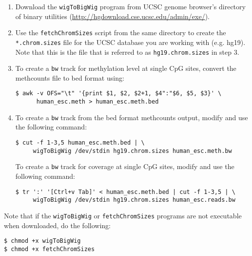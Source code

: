 \documentclass[10pt]{article}
\newcommand{\prog}[1]{\texttt{#1}}
\newcommand{\fn}[1]{\texttt{#1}}
\begin{document}
{{\begin{enumerate}
\item Download the \prog{wigToBigWig} program from UCSC genome
  browser's directory of binary utilities
  (\url{http://hgdownload.cse.ucsc.edu/admin/exe/}).
\item Use the \fn{fetchChromSizes} script from the same directory to
  create the \fn{*.chrom.sizes} file for the UCSC database you are
  working with (e.g. hg19). Note that this is the file that is
  referred to as \fn{hg19.chrom.sizes} in step 3.
\item To create a \fn{bw} track for methylation level at single CpG
  sites, convert the methcounts file to bed format using:
\begin{verbatim}
$ awk -v OFS="\t" '{print $1, $2, $2+1, $4":"$6, $5, $3}' \
      human_esc.meth > human_esc.meth.bed
\end{verbatim}
\item To create a \fn{bw} track from the bed format methcounts output,
modify and use the following command:
\begin{verbatim}
$ cut -f 1-3,5 human_esc.meth.bed | \
     wigToBigWig /dev/stdin hg19.chrom.sizes human_esc.meth.bw
\end{verbatim}
  To create a \fn{bw} track for coverage at single CpG sites, modify
  and use the following command:
\begin{verbatim}
$ tr ':' '[Ctrl+v Tab]' < human_esc.meth.bed | cut -f 1-3,5 | \
     wigToBigWig /dev/stdin hg19.chrom.sizes human_esc.reads.bw
\end{verbatim}
\end{enumerate}
Note that if the \prog{wigToBigWig} or \prog{fetchChromSizes} programs
are not executable when downloaded, do the following:
\begin{verbatim}
$ chmod +x wigToBigWig
$ chmod +x fetchChromSizes
\end{verbatim}

}}
\end{document}
